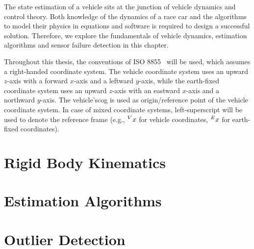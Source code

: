 The state estimation of a vehicle sits at the junction of vehicle dynamics and control theory. Both knowledge of the dynamics of a race car and the algorithms to model their physics in equations and software is required to design a successful solution. Therefore, we explore the fundamentals of vehicle dynamics, estimation algorithms and sensor failure detection in this chapter.

Throughout this thesis, the conventions of ISO 8855~\cite{ISO.2011} will be used, which assumes a right-handed coordinate system. The vehicle coordinate system uses an upward $z$-axis with a forward $x$-axis and a leftward $y$-axis, while the earth-fixed coordinate system uses an upward $z$-axis with an eastward $x$-axis and a northward $y$-axis. The vehicle's\gls{cog} is used as origin/reference point of the vehicle coordinate system. In case of mixed coordinate systems, left-superscript will be used to denote the reference frame (e.g., $\prescript{V}{}{x}$ for vehicle coordinates, $\prescript{E}{}{x}$ for earth-fixed coordinates).

\section{Rigid Body Kinematics}


\section{Estimation Algorithms}


\section{Outlier Detection}

